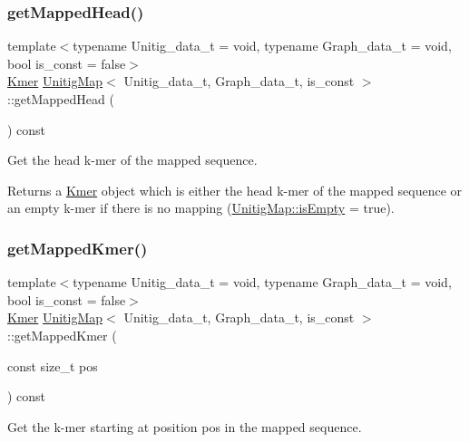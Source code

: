 \subsubsection{\texorpdfstring{get\+Mapped\+Head()}{getMappedHead()}}
{\footnotesize\ttfamily template$<$typename Unitig\+\_\+data\+\_\+t = void, typename Graph\+\_\+data\+\_\+t = void, bool is\+\_\+const = false$>$ \\
\hyperlink{classKmer}{Kmer} \hyperlink{classUnitigMap}{Unitig\+Map}$<$ Unitig\+\_\+data\+\_\+t, Graph\+\_\+data\+\_\+t, is\+\_\+const $>$\+::get\+Mapped\+Head (\begin{DoxyParamCaption}{ }\end{DoxyParamCaption}) const}



Get the head k-\/mer of the mapped sequence. 

\begin{DoxyReturn}{Returns}
a \hyperlink{classKmer}{Kmer} object which is either the head k-\/mer of the mapped sequence or an empty k-\/mer if there is no mapping (\hyperlink{structUnitigMapBase_ade629940b2611494dbf233cb1144da80}{Unitig\+Map\+::is\+Empty} = true). 
\end{DoxyReturn}
\mbox{\label{classUnitigMap_a9ac111e6783b3344f0db407d05f1b966}} 
\subsubsection{\texorpdfstring{get\+Mapped\+Kmer()}{getMappedKmer()}}
{\footnotesize\ttfamily template$<$typename Unitig\+\_\+data\+\_\+t = void, typename Graph\+\_\+data\+\_\+t = void, bool is\+\_\+const = false$>$ \\
\hyperlink{classKmer}{Kmer} \hyperlink{classUnitigMap}{Unitig\+Map}$<$ Unitig\+\_\+data\+\_\+t, Graph\+\_\+data\+\_\+t, is\+\_\+const $>$\+::get\+Mapped\+Kmer (\begin{DoxyParamCaption}\item[{const size\+\_\+t}]{pos }\end{DoxyParamCaption}) const}



Get the k-\/mer starting at position pos in the mapped sequence. 


